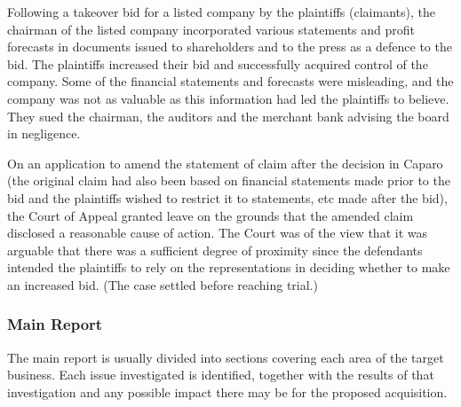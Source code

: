 \documentclass[
]{article}
\begin{document}
Following a takeover bid for a listed company by the plaintiffs
(claimants), the chairman of the listed company incorporated various
statements and profit forecasts in documents issued to shareholders and
to the press as a defence to the bid. The plaintiffs increased their bid
and successfully acquired control of the company. Some of the financial
statements and forecasts were misleading, and the company was not as
valuable as this information had led the plaintiffs to believe. They
sued the chairman, the auditors and the merchant bank advising the board
in negligence.

On an application to amend the statement of claim after the decision in
Caparo (the original claim had also been based on financial statements
made prior to the bid and the plaintiffs wished to restrict it to
statements, etc made after the bid), the Court of Appeal granted leave
on the grounds that the amended claim disclosed a reasonable cause of
action. The Court was of the view that it was arguable that there was a
sufficient degree of proximity since the defendants intended the
plaintiffs to rely on the representations in deciding whether to make an
increased bid. (The case settled before reaching trial.)

\hypertarget{main-report}{%
\subsubsection{Main Report}\label{main-report}}

The main report is usually divided into sections covering each area of
the target business. Each issue investigated is identified, together
with the results of that investigation and any possible impact there may
be for the proposed acquisition.
\end{document}
